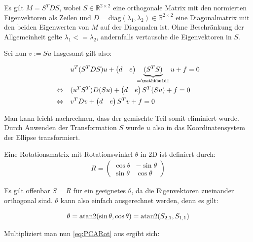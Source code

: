 Es gilt $M = S^TDS$, wobei $S\in\mathbb{R}^{2\times2}$ eine orthogonale Matrix mit den normierten Eigenvektoren als Zeilen und $D = \text{diag}(\lambda_1, \lambda_2)\in\mathbb{R}^{2\times2}$ eine Diagonalmatrix mit den beiden Eigenwerten von $M$ auf der Diagonalen ist. Ohne Beschränkung der Allgemeinheit gelte $\lambda_1 <= \lambda_2$, andernfalls vertausche die Eigenvektoren in $S$. 

Sei nun $v := Su$
Insgesamt gilt also:

\begin{equation*} \label{eq:PCARot}
\begin{aligned}
&u^T(S^TDS)u +\begin{pmatrix}d & e\end{pmatrix}\underbrace{(S^TS)}_{=\ind}u + f = 0 \\
\Leftrightarrow\quad &(u^TS^T)D(Su) +\begin{pmatrix}d & e\end{pmatrix}S^T(Su) + f = 0 \\
\Leftrightarrow\quad &v^{T}Dv +\begin{pmatrix}d & e\end{pmatrix}S^Tv + f = 0 
\end{aligned}
\end{equation*}

Man kann leicht nachrechnen, dass der gemischte Teil somit eliminiert wurde. Durch Anwenden der Transformation $S$ wurde $u$ also in das Koordinatensystem der Ellipse transformiert.

Eine Rotationsmatrix mit Rotationswinkel $\theta$ in 2D ist definiert durch: 
\begin{equation}
\begin{aligned}
R = \begin{pmatrix}\cos\theta & -\sin\theta \\ \sin\theta & \cos\theta\end{pmatrix}
\end{aligned}
\end{equation}

Es gilt offenbar $S = R$ für ein geeignetes $\theta$, da die Eigenvektoren zueinander orthogonal sind. $\theta$ kann also einfach ausgerechnet werden, denn es gilt:

\begin{equation*}
\theta = \text{atan2}(\sin\theta, \cos\theta) = \text{atan2}(S_{2,1}, S_{1,1})
\end{equation*}

Multipliziert man nun \ref{eq:PCARot} aus ergibt sich:

